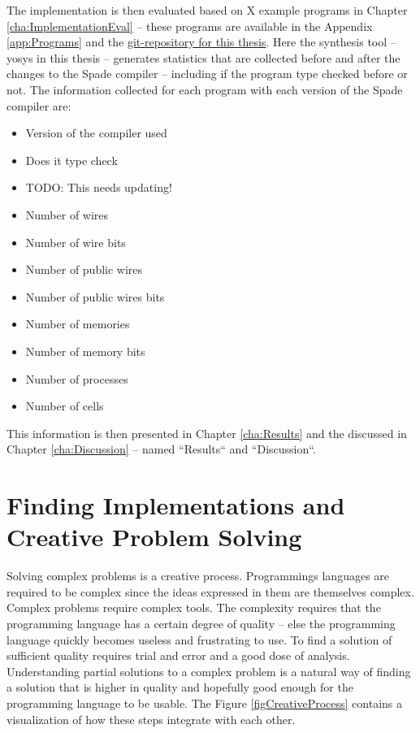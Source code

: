 \documentclass[msc,lith,english]{liuthesis}
\begin{document}
The implementation is then evaluated based on X example programs in Chapter \ref{cha:ImplementationEval} -- these programs are available in the Appendix \ref{app:Programs} and the \href{https://github.com/FredTheDino/thesis-spade-lang}{git-repository for this thesis}. Here the synthesis tool -- yosys in this thesis -- generates statistics that are collected before and after the changes to the Spade compiler -- including if the program type checked before or not. The information collected for each program with each version of the Spade compiler are:

\begin{itemize}
    \setlength\itemsep{0.5em}
    \item Version of the compiler used
    \item Does it type check
    \item TODO: This needs updating!
    \item Number of wires
    \item Number of wire bits
    \item Number of public wires
    \item Number of public wires bits
    \item Number of memories
    \item Number of memory bits
    \item Number of processes
    \item Number of cells
\end{itemize}
This information is then presented in Chapter \ref{cha:Results} and the discussed in Chapter \ref{cha:Discussion} -- named ``Results`` and ``Discussion``.

\section{Finding Implementations and Creative Problem Solving}
Solving complex problems is a creative process. Programmings languages are required to be complex since the ideas expressed in them are themselves complex. Complex problems require complex tools. The complexity requires that the programming language
has a certain degree of quality -- else the programming language quickly becomes useless and frustrating to use. To find a solution of sufficient quality requires trial and error and a good dose of analysis. Understanding partial solutions to a complex problem is a natural way of finding a solution that is higher in quality and hopefully good enough for the programming language to be usable. The Figure \ref{figCreativeProcess} contains a visualization of how these steps integrate with each other.
\end{document}
